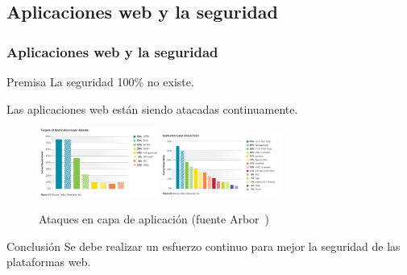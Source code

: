 \subsection{Aplicaciones web y la seguridad}
\begin{frame}[shrink=20]
  \frametitle{Aplicaciones web y la seguridad}
  \begin{block}{Premisa}
     La seguridad 100\% no existe.
  \end{block}
  Las aplicaciones web están siendo atacadas continuamente.
  \begin{figure}
    \includegraphics[width=0.35\textwidth]{fig/application-attacks-2}%
    \includegraphics[width=0.35\textwidth]{fig/application-attacks-1}
    \label{fig:applicationattacks}
    \caption{\small{Ataques en capa de aplicación (fuente Arbor~\cite{articleArbor})}}
  \end{figure}
  \begin{block}{Conclusión}
    Se debe realizar un esfuerzo continuo para mejor la seguridad de las plataformas web.
  \end{block}
\end{frame}

